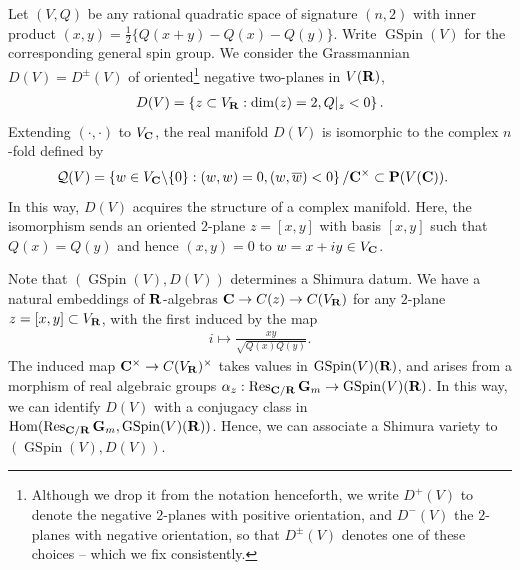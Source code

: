 \documentclass{amsart}
\theoremstyle{definition}
\theoremstyle{definition}
\theoremstyle{definition}
\begin{document}
Let $(V, Q)$ be any rational quadratic space of signature $(n,2)$ with inner product $(x,y) = \frac{1}{2} \lbrace Q(x+y) - Q(x)-Q(y) \rbrace$.
Write $\operatorname{GSpin}(V)$ for the corresponding general spin group. 
We consider the Grassmannian $D(V) = D^{\pm}(V)$ of oriented\footnote{Although we drop it from the notation
henceforth, we write $D^+(V)$ to denote the negative $2$-planes with positive orientation, and $D^-(V)$ the $2$-planes with negative 
orientation, so that $D^{\pm}(V)$ denotes one of these choices -- which we fix consistently.} negative two-planes in $V( {\bf{R}})$,
\begin{align*} D(V) = \left\lbrace z \subset V_{{\bf{R}}}: \dim(z)=2, Q\vert_z <0 \right\rbrace. \end{align*} 
Extending $(\cdot, \cdot)$ to $V_{\bf{C}}$, the real manifold $D(V)$ is isomorphic to the complex $n$-fold defined by 
\begin{align*} \mathcal{Q}(V) &=  \left\lbrace w \in V_{\bf{C}} \backslash \lbrace 0 \rbrace: 
(w,w) =0, (w, \overline{w}) <0 \right\rbrace / {\bf{C}}^{\times} \subset {\bf{P}}(V({\bf{C}})). \end{align*}
In this way, $D(V)$ acquires the structure of a complex manifold. Here, the isomorphism sends an 
oriented $2$-plane $z = [x, y]$ with basis $[x, y]$ such that $Q(x) = Q(y)$ and hence $(x, y) = 0$ to $w= x + iy \in V_{\bf{C}}$.

Note that $(\operatorname{GSpin}(V), D(V))$ determines a Shimura datum. We have a natural embeddings of ${\bf{R}}$-algebras 
${\bf{C}} \rightarrow C(z) \rightarrow C(V_{\bf{R}})$ for any $2$-plane $z = [x, y] \subset V_{\bf{R}}$, with the first induced by the map 
\begin{align*} i \longmapsto \frac{x y}{ \sqrt{Q(x) Q(y)}}. \end{align*}
The induced map ${\bf{C}}^{\times} \rightarrow C(V_{\bf{R}})^{\times}$ takes values in $\operatorname{GSpin}(V)({\bf{R}})$,
and arises from a morphism of real algebraic groups 
$\alpha_z: \operatorname{Res}_{ {\bf{C}} /{\bf{R}}} {\bf{G}}_m \rightarrow \operatorname{GSpin}(V)({\bf{R}})$.
In this way, we can identify $D(V)$ with a conjugacy class in 
$\operatorname{Hom}(\operatorname{Res}_{ {\bf{C}} /{\bf{R}}} {\bf{G}}_m, \operatorname{GSpin}(V)({\bf{R}}) )$.
Hence, we can associate a Shimura variety to $(\operatorname{GSpin}(V), D(V))$.
 
\end{document}
